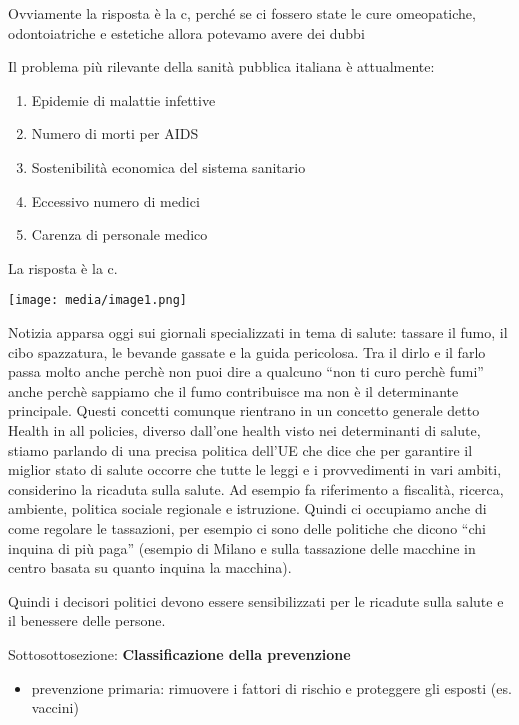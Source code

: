 \documentclass[]{article}
\begin{document}
Ovviamente la risposta è la c, perché se ci fossero state le cure
omeopatiche, odontoiatriche e estetiche allora potevamo avere dei dubbi

Il problema più rilevante della sanità pubblica italiana è attualmente:

\begin{enumerate}
\def\labelenumi{\alph{enumi})}
\item
  Epidemie di malattie infettive
\item
  Numero di morti per AIDS
\item
  Sostenibilità economica del sistema sanitario
\item
  Eccessivo numero di medici
\item
  Carenza di personale medico
\end{enumerate}

La risposta è la c.

\texttt{[image: media/image1.png]}

Notizia apparsa oggi sui giornali specializzati in tema di salute:
tassare il fumo, il cibo spazzatura, le bevande gassate e la guida
pericolosa. Tra il dirlo e il farlo passa molto anche perchè non puoi
dire a qualcuno ``non ti curo perchè fumi'' anche perchè sappiamo che il
fumo contribuisce ma non è il determinante principale. Questi concetti
comunque rientrano in un concetto generale detto Health in all policies,
diverso dall'one health visto nei determinanti di salute, stiamo
parlando di una precisa politica dell'UE che dice che per garantire il
miglior stato di salute occorre che tutte le leggi e i provvedimenti in
vari ambiti, considerino la ricaduta sulla salute. Ad esempio fa
riferimento a fiscalità, ricerca, ambiente, politica sociale regionale e
istruzione. Quindi ci occupiamo anche di come regolare le tassazioni,
per esempio ci sono delle politiche che dicono ``chi inquina di più
paga'' (esempio di Milano e sulla tassazione delle macchine in centro
basata su quanto inquina la macchina).

Quindi i decisori politici devono essere sensibilizzati per le ricadute
sulla salute e il benessere delle persone.

Sottosottosezione: \textbf{Classificazione della prevenzione}

\begin{itemize}
\item
  prevenzione primaria: rimuovere i fattori di rischio e proteggere gli
  esposti (es. vaccini)
\end{itemize}
\end{document}
